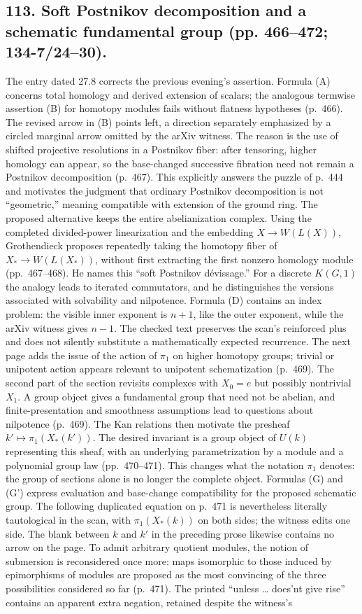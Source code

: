 \documentclass[10pt,oneside]{book}
\begin{document}
\subsection*{113. Soft Postnikov decomposition and a schematic fundamental group (pp. 466--472; 134-7/24--30).}
The entry dated 27.8 corrects the previous evening's assertion. Formula (A) concerns total homology and derived extension of scalars; the analogous termwise assertion (B) for homotopy modules fails without flatness hypotheses (p.~466). The revised arrow in (B) points left, a direction separately emphasized by a circled marginal arrow omitted by the arXiv witness. The reason is the use of shifted projective resolutions in a Postnikov fiber: after tensoring, higher homology can appear, so the base-changed successive fibration need not remain a Postnikov decomposition (p.~467). This explicitly answers the puzzle of p.~444 and motivates the judgment that ordinary Postnikov decomposition is not ``geometric,'' meaning compatible with extension of the ground ring. The proposed alternative keeps the entire abelianization complex. Using the completed divided-power linearization and the embedding $X\to W(L(X))$, Grothendieck proposes repeatedly taking the homotopy fiber of $X_*\to W(L(X_*))$, without first extracting the first nonzero homology module (pp.~467--468). He names this ``soft Postnikov d\'evissage.'' For a discrete $K(G,1)$ the analogy leads to iterated commutators, and he distinguishes the versions associated with solvability and nilpotence. Formula (D) contains an index problem: the visible inner exponent is $n+1$, like the outer exponent, while the arXiv witness gives $n-1$. The checked text preserves the scan's reinforced plus and does not silently substitute a mathematically expected recurrence. The next page adds the issue of the action of $\pi_1$ on higher homotopy groups; trivial or unipotent action appears relevant to unipotent schematization (p.~469). The second part of the section revisits complexes with $X_0=e$ but possibly nontrivial $X_1$. A group object gives a fundamental group that need not be abelian, and finite-presentation and smoothness assumptions lead to questions about nilpotence (p.~469). The Kan relations then motivate the presheaf $k'\mapsto\pi_1(X_*(k'))$. The desired invariant is a group object of $U(k)$ representing this sheaf, with an underlying parametrization by a module and a polynomial group law (pp.~470--471). This changes what the notation $\pi_1$ denotes: the group of sections alone is no longer the complete object. Formulas (G) and (G') express evaluation and base-change compatibility for the proposed schematic group. The following duplicated equation on p.~471 is nevertheless literally tautological in the scan, with $\pi_1(X_*(k))$ on both sides; the witness edits one side. The blank between $k$ and $k'$ in the preceding prose likewise contains no arrow on the page. To admit arbitrary quotient modules, the notion of submersion is reconsidered once more: maps isomorphic to those induced by epimorphisms of modules are proposed as the most convincing of the three possibilities considered so far (p.~471). The printed ``unless \ldots{} does'nt give rise'' contains an apparent extra negation, retained despite the witness's 
\end{document}

